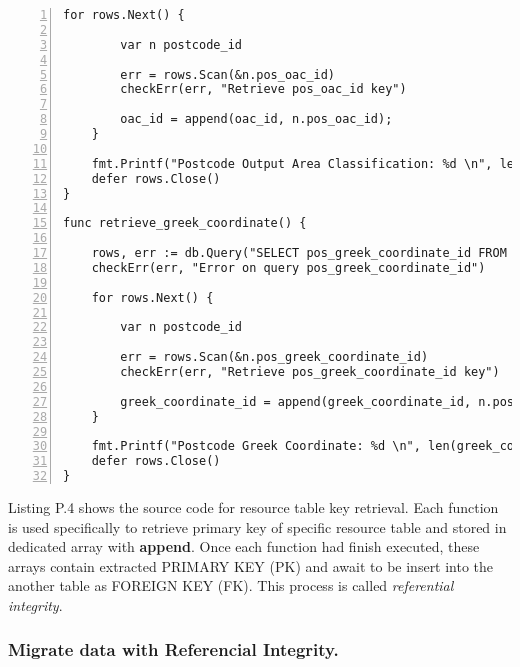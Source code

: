 \begin{lstlisting}[breaklines, frame=single, numbers=left, caption={Resource Table Key Retrieval Function.}, label=commandline-02]
	for rows.Next() {
	
		var n postcode_id
		
		err = rows.Scan(&n.pos_oac_id)
		checkErr(err, "Retrieve pos_oac_id key")
		
		oac_id = append(oac_id, n.pos_oac_id); 
	}
	
	fmt.Printf("Postcode Output Area Classification: %d \n", len(oac_id))
	defer rows.Close()
}

func retrieve_greek_coordinate() {

	rows, err := db.Query("SELECT pos_greek_coordinate_id FROM nspl_rawdata AS rawdata JOIN postcode_greek_coordinate AS pgc ON pgc.pos_longitude = rawdata.longitude AND pgc.pos_latitude = rawdata.latitude;" )
	checkErr(err, "Error on query pos_greek_coordinate_id")	 
	
	for rows.Next() {
	
		var n postcode_id
		
		err = rows.Scan(&n.pos_greek_coordinate_id)
		checkErr(err, "Retrieve pos_greek_coordinate_id key")
		
		greek_coordinate_id = append(greek_coordinate_id, n.pos_greek_coordinate_id); 
	}
	
	fmt.Printf("Postcode Greek Coordinate: %d \n", len(greek_coordinate_id))
	defer rows.Close()
}

\end{lstlisting}

Listing P.4 shows the source code for resource table key retrieval. Each function is used specifically to retrieve primary key of specific resource table and stored in dedicated array with \textbf{append}. Once each function had finish executed, these arrays contain extracted PRIMARY KEY (PK) and await to be insert into the another table as FOREIGN KEY (FK). This process is called \textit{referential integrity}.

\newpage

\subsubsection{Migrate data with Referencial Integrity.}

